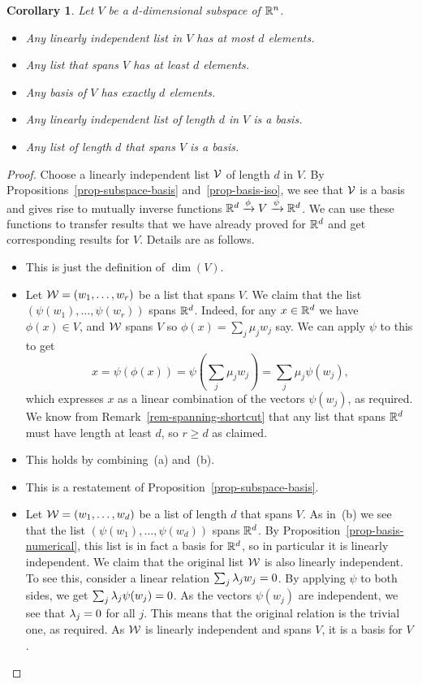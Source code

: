 \documentclass[reqno]{amsart}
\newtheorem{corollary}[theorem]{Corollary}
\theoremstyle{definition}
\begin{document}
\begin{corollary}\label{cor-basis-numerical}
 Let $V$ be a $d$-dimensional subspace of ${\mathbb{R}}^n$.
 \begin{itemize}
  \item[(a)] Any linearly independent list in $V$ has at most $d$ elements.
  \item[(b)] Any list that spans $V$ has at least $d$ elements.
  \item[(c)] Any basis of $V$ has exactly $d$ elements.
  \item[(d)] Any linearly independent list of length $d$ in $V$ is a basis.
  \item[(e)] Any list of length $d$ that spans $V$ is a basis.
 \end{itemize}
\end{corollary}
\begin{proof}
 Choose a linearly independent list $\mathcal{V}$ of length $d$ in $V$.  By
 Propositions~\ref{prop-subspace-basis} and~\ref{prop-basis-iso}, we
 see that $\mathcal{V}$ is a basis and gives rise to mutually inverse functions
 ${\mathbb{R}}^d\xrightarrow{\phi}V\xrightarrow{\psi}{\mathbb{R}}^d$.  We can use these functions to
 transfer results that we have already proved for ${\mathbb{R}}^d$ and get
 corresponding results for $V$.  Details are as follows.
 \begin{itemize}
  \item[(a)] This is just the definition of $\dim(V)$.
  \item[(b)] Let $\mathcal{W}=(w_1,\dotsc,w_r)$ be a list that spans $V$.  We
   claim that the list $(\psi(w_1),\dotsc,\psi(w_r))$ spans ${\mathbb{R}}^d$.
   Indeed, for any $x\in{\mathbb{R}}^d$ we have $\phi(x)\in V$, and $\mathcal{W}$ spans
   $V$ so $\phi(x)=\sum_j\mu_jw_j$ say.  We can apply $\psi$ to this
   to get
   \[ x = \psi(\phi(x)) = \psi(\sum_j\mu_jw_j)= \sum_j\mu_j\psi(w_j),
   \]
   which expresses $x$ as a linear combination of the vectors
   $\psi(w_j)$, as required.  We know from
   Remark~\ref{rem-spanning-shortcut} that any list that spans ${\mathbb{R}}^d$
   must have length at least $d$, so $r\geq d$ as claimed.
  \item[(c)] This holds by combining~(a) and~(b).
  \item[(d)] This is a restatement of
   Proposition~\ref{prop-subspace-basis}.
  \item[(e)] Let $\mathcal{W}=(w_1,\dotsc,w_d)$ be a list of length $d$ that
   spans $V$.  As in~(b) we see that the list
   $(\psi(w_1),\dotsc,\psi(w_d))$ spans ${\mathbb{R}}^d$.  By
   Proposition~\ref{prop-basis-numerical}, this list is in fact a
   basis for ${\mathbb{R}}^d$, so in particular it is linearly independent.  We
   claim that the original list $\mathcal{W}$ is also linearly independent.
   To see this, consider a linear relation $\sum_j\lambda_jw_j=0$.  By
   applying $\psi$ to both sides, we get $\sum_j\lambda_j\psi(w_j)=0$.  As
   the vectors $\psi(w_j)$ are independent, we see that $\lambda_j=0$ for
   all $j$.  This means that the original relation is the trivial one,
   as required.  As $\mathcal{W}$ is linearly independent and spans $V$, it is
   a basis for $V$.
   \qedhere
 \end{itemize}
\end{proof}
\end{document}
